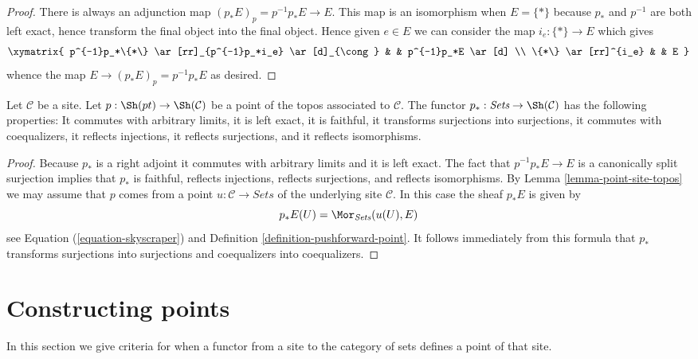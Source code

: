 \begin{proof}
There is always an adjunction map $(p_*E)_p = p^{-1}p_*E \to E$.
This map is an isomorphism when $E = \{*\}$ because $p_*$
and $p^{-1}$ are both left exact, hence transform the final
object into the final object. Hence given $e \in E$ we can consider
the map $i_e : \{*\} \to E$ which gives
$$
\xymatrix{
p^{-1}p_*\{*\} \ar[rr]_{p^{-1}p_*i_e} \ar[d]_{\cong} & & p^{-1}p_*E \ar[d] \\
\{*\} \ar[rr]^{i_e} & & E
}
$$
whence the map $E \to (p_*E)_p = p^{-1}p_*E$ as desired.
\end{proof}

\begin{lemma}
\label{lemma-skyscraper-functor-exact}
Let $\mathcal{C}$ be a site. Let
$p : \Sh(pt) \to \Sh(\mathcal{C})$ be a point of
the topos associated to $\mathcal{C}$.
The functor $p_* : \textit{Sets} \to \Sh(\mathcal{C})$
has the following properties: It commutes with arbitrary limits,
it is left exact, it is faithful, it transforms surjections into surjections,
it commutes with coequalizers, it reflects injections, it reflects
surjections, and it reflects isomorphisms.
\end{lemma}

\begin{proof}
Because $p_*$ is a right adjoint it commutes with arbitrary limits and
it is left exact. The fact that $p^{-1}p_*E \to E$ is a canonically
split surjection implies that $p_*$ is faithful, reflects injections,
reflects surjections, and reflects isomorphisms. By
Lemma \ref{lemma-point-site-topos}
we may assume that $p$ comes from a point $u : \mathcal{C} \to \textit{Sets}$
of the underlying site $\mathcal{C}$. In this case the sheaf $p_*E$ is given by
$$
p_*E(U) = \Mor_{\textit{Sets}}(u(U), E)
$$
see Equation (\ref{equation-skyscraper}) and
Definition \ref{definition-pushforward-point}.
It follows immediately from this formula that $p_*$ transforms
surjections into surjections and coequalizers into coequalizers.
\end{proof}






\section{Constructing points}
\label{section-construct-points}

\noindent
In this section we give criteria for when a functor
from a site to the category of sets defines a point of that site.

